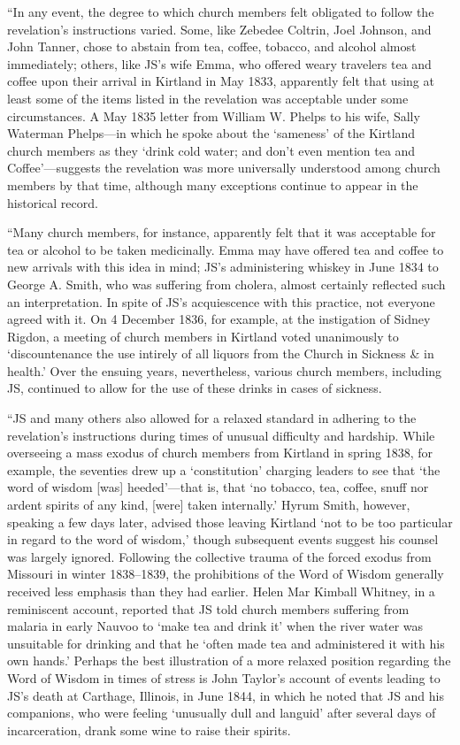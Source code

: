 			``In any event, the degree to which church members felt obligated to follow the revelation's instructions varied. Some, like Zebedee Coltrin, Joel Johnson, and John Tanner, chose to abstain from tea, coffee, tobacco, and alcohol almost immediately; others, like JS's wife Emma, who offered weary travelers tea and coffee upon their arrival in Kirtland in May 1833, apparently felt that using at least some of the items listed in the revelation was acceptable under some circumstances. A May 1835 letter from William W. Phelps to his wife, Sally Waterman Phelps---in which he spoke about the `sameness' of the Kirtland church members as they `drink cold water; and don't even mention tea and Coffee'---suggests the revelation was more universally understood among church members by that time, although many exceptions continue to appear in the historical record.

			``Many church members, for instance, apparently felt that it was acceptable for tea or alcohol to be taken medicinally. Emma may have offered tea and coffee to new arrivals with this idea in mind; JS's administering whiskey in June 1834 to George A. Smith, who was suffering from cholera, almost certainly reflected such an interpretation. In spite of JS's acquiescence with this practice, not everyone agreed with it. On 4 December 1836, for example, at the instigation of Sidney Rigdon, a meeting of church members in Kirtland voted unanimously to `discountenance the use intirely of all liquors from the Church in Sickness \& in health.' Over the ensuing years, nevertheless, various church members, including JS, continued to allow for the use of these drinks in cases of sickness.

			``JS and many others also allowed for a relaxed standard in adhering to the revelation's instructions during times of unusual difficulty and hardship. While overseeing a mass exodus of church members from Kirtland in spring 1838, for example, the seventies drew up a `constitution' charging leaders to see that `the word of wisdom [was] heeded'---that is, that `no tobacco, tea, coffee, snuff nor ardent spirits of any kind, [were] taken internally.' Hyrum Smith, however, speaking a few days later, advised those leaving Kirtland `not to be too particular in regard to the word of wisdom,' though subsequent events suggest his counsel was largely ignored. Following the collective trauma of the forced exodus from Missouri in winter 1838--1839, the prohibitions of the Word of Wisdom generally received less emphasis than they had earlier. Helen Mar Kimball Whitney, in a reminiscent account, reported that JS told church members suffering from malaria in early Nauvoo to `make tea and drink it' when the river water was unsuitable for drinking and that he `often made tea and administered it with his own hands.' Perhaps the best illustration of a more relaxed position regarding the Word of Wisdom in times of stress is John Taylor's account of events leading to JS's death at Carthage, Illinois, in June 1844, in which he noted that JS and his companions, who were feeling `unusually dull and languid' after several days of incarceration, drank some wine to raise their spirits.

